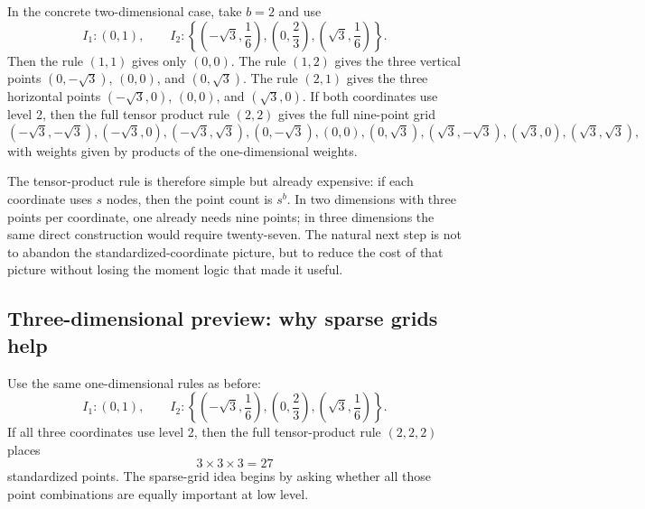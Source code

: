 \documentclass[11pt]{article}
\numberwithin{equation}{section}
\begin{document}
In the concrete two-dimensional case, take \(b=2\) and use
\begin{equation}
  I_1:(0,1),
  \qquad
  I_2:\left\{\left(-\sqrt3,\frac16\right),\left(0,\frac23\right),
  \left(\sqrt3,\frac16\right)\right\}.
  \label{eq:p36-level1-level2-rules}
\end{equation}
Then the rule \((1,1)\) gives only \((0,0)\).  The rule \((1,2)\) gives the
three vertical points \((0,-\sqrt3)\), \((0,0)\), and \((0,\sqrt3)\).  The rule
\((2,1)\) gives the three horizontal points \((-\sqrt3,0)\), \((0,0)\), and
\((\sqrt3,0)\).  If both coordinates use level 2, then the full tensor product
rule \((2,2)\) gives the full nine-point grid
\begin{equation}
  (-\sqrt3,-\sqrt3),
  (-\sqrt3,0),
  (-\sqrt3,\sqrt3),
  (0,-\sqrt3),
  (0,0),
  (0,\sqrt3),
  (\sqrt3,-\sqrt3),
  (\sqrt3,0),
  (\sqrt3,\sqrt3),
  \label{eq:p35-nine-point-grid}
\end{equation}
with weights given by products of the one-dimensional weights.

The tensor-product rule is therefore simple but already expensive: if each
coordinate uses \(s\) nodes, then the point count is \(s^b\).  In two dimensions
with three points per coordinate, one already needs nine points; in three
dimensions the same direct construction would require twenty-seven.  The natural
next step is not to abandon the standardized-coordinate picture, but to reduce the
cost of that picture without losing the moment logic that made it useful.

\subsection{Three-dimensional preview: why sparse grids help}
\label{subsec:p37-3d-preview}

Use the same one-dimensional rules as before:
\begin{equation}
  I_1:(0,1),
  \qquad
  I_2:\left\{\left(-\sqrt3,\frac16\right),\left(0,\frac23\right),
  \left(\sqrt3,\frac16\right)\right\}.
  \label{eq:p37-level1-level2-rules}
\end{equation}
If all three coordinates use level 2, then the full tensor-product rule
\((2,2,2)\) places
\begin{equation}
  3\times 3\times 3 = 27
  \label{eq:p37-27-points}
\end{equation}
standardized points.  The sparse-grid idea begins by asking whether all those
point combinations are equally important at low level.
\end{document}
